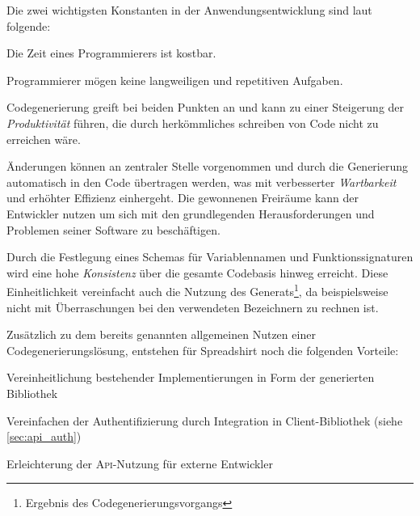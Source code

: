 
Die zwei wichtigsten Konstanten in der Anwendungsentwicklung sind laut \parencite{herrington2003code} folgende:
\begin{compactitem}
    \item Die Zeit eines Programmierers ist kostbar.
    \item Programmierer mögen keine langweiligen und repetitiven Aufgaben.
\end{compactitem}
Codegenerierung greift bei beiden Punkten an und kann zu einer Steigerung der \emph{Produktivität} führen, die durch herkömmliches schreiben von Code nicht zu erreichen wäre. 

Änderungen können an zentraler Stelle vorgenommen und durch die Generierung automatisch in den Code übertragen werden, was mit verbesserter \emph{Wartbarkeit} und erhöhter Effizienz einhergeht.
Die gewonnenen Freiräume kann der Entwickler nutzen um sich mit den grundlegenden Herausforderungen und Problemen seiner Software zu beschäftigen.

Durch die Festlegung eines Schemas für Variablennamen und Funktionssignaturen wird eine hohe \emph{Konsistenz} über die gesamte Codebasis hinweg erreicht.
Diese Einheitlichkeit vereinfacht auch die Nutzung des Generats\footnote{Ergebnis des Codegenerierungsvorgangs}, da beispielsweise nicht mit Überraschungen bei den verwendeten Bezeichnern zu rechnen ist.



Zusätzlich zu dem bereits genannten allgemeinen Nutzen einer Codegenerierungslösung, entstehen für Spreadshirt noch die folgenden Vorteile:
\begin{compactitem}
    \item Vereinheitlichung bestehender Implementierungen in Form der generierten Bibliothek
    \item Vereinfachen der Authentifizierung durch Integration in Client-Bibliothek (siehe \cref{sec:api_auth})
    \item Erleichterung der \textsc{Api}-Nutzung für externe Entwickler
\end{compactitem}

